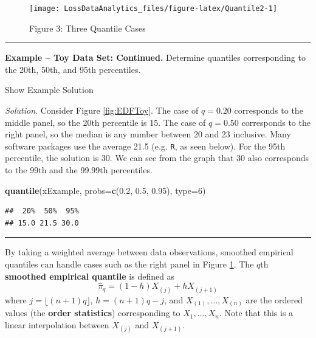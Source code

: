 \documentclass[]{book}
\newenvironment{Shaded}{\begin{snugshade}}{\end{snugshade}}
\newcommand{\KeywordTok}[1]{\textcolor[rgb]{0.13,0.29,0.53}{\textbf{{#1}}}}
\newcommand{\DataTypeTok}[1]{\textcolor[rgb]{0.13,0.29,0.53}{{#1}}}
\newcommand{\DecValTok}[1]{\textcolor[rgb]{0.00,0.00,0.81}{{#1}}}
\newcommand{\FloatTok}[1]{\textcolor[rgb]{0.00,0.00,0.81}{{#1}}}
\newcommand{\NormalTok}[1]{{#1}}
\theoremstyle{definition}
\theoremstyle{definition}
\theoremstyle{definition}
\theoremstyle{remark}
\begin{document}
\begin{figure}

{\centering \texttt{[image: LossDataAnalytics\_files/figure-latex/Quantile2-1]} 

}

\caption{Figure 3: Three Quantile Cases}\label{fig:Quantile2}
\end{figure}

\begin{center}\rule{0.5\linewidth}{\linethickness}\end{center}

\textbf{Example -- Toy Data Set: Continued.} Determine quantiles
corresponding to the 20th, 50th, and 95th percentiles.

Show Example Solution

\hypertarget{toggleExampleToyq}{}
\emph{Solution}. Consider Figure \ref{fig:EDFToy}. The case of
\(q=0.20\) corresponds to the middle panel, so the 20th percentile is
15. The case of \(q=0.50\) corresponds to the right panel, so the median
is any number between 20 and 23 inclusive. Many software packages use
the average 21.5 (e.g. \texttt{R}, as seen below). For the 95th
percentile, the solution is 30. We can see from the graph that 30 also
corresponds to the 99th and the 99.99th percentiles.

\begin{Shaded}
\begin{Highlighting}[]
\KeywordTok{quantile}\NormalTok{(xExample, }\DataTypeTok{probs=}\KeywordTok{c}\NormalTok{(}\FloatTok{0.2}\NormalTok{, }\FloatTok{0.5}\NormalTok{, }\FloatTok{0.95}\NormalTok{), }\DataTypeTok{type=}\DecValTok{6}\NormalTok{)}
\end{Highlighting}
\end{Shaded}

\begin{verbatim}
##  20%  50%  95% 
## 15.0 21.5 30.0
\end{verbatim}

\begin{center}\rule{0.5\linewidth}{\linethickness}\end{center}

By taking a weighted average between data observations, smoothed
empirical quantiles can handle cases such as the right panel in Figure
\ref{fig:Quantile2}. The \(q\)th \textbf{smoothed empirical quantile} is
defined as \[\hat{\pi}_q = (1-h) X_{(j)} + h X_{(j+1)}\] where
\(j=\lfloor(n+1)q\rfloor\), \(h=(n+1)q-j\), and
\(X_{(1)}, \ldots, X_{(n)}\) are the ordered values (the \textbf{order
statistics}) corresponding to \(X_1, \ldots, X_n\). Note that this is a
linear interpolation between \(X_{(j)}\) and \(X_{(j+1)}\).
\end{document}
